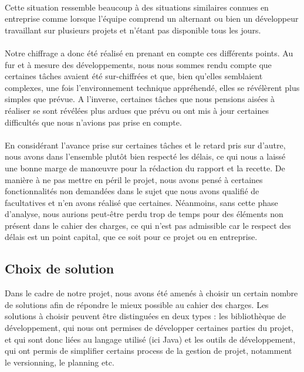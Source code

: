 \documentclass[a4paper,11pt]{article}
\begin{document}
\paragraph{} Cette situation ressemble beaucoup à des situations similaires connues en entreprise comme lorsque l'équipe comprend un alternant ou bien un développeur travaillant sur plusieurs projets et n'étant pas disponible tous les jours.

\paragraph{} Notre chiffrage a donc été réalisé en prenant en compte ces différents points. Au fur et à mesure des développements, nous nous sommes rendu compte que certaines tâches avaient été sur-chiffrées et que, bien qu'elles semblaient complexes, une fois l'environnement technique appréhendé, elles se révélèrent plus simples que prévue. A l'inverse, certaines tâches que nous pensions aisées à réaliser se sont révélées plus ardues que prévu ou ont mis à jour certaines difficultés que nous n'avions pas prise en compte.

\paragraph{} En considérant l'avance prise sur certaines tâches et le retard pris sur d'autre, nous avons dans l'ensemble plutôt bien respecté les délais, ce qui nous a laissé une bonne marge de manœuvre pour la rédaction du rapport et la recette. De manière à ne pas mettre en péril le projet, nous avons pensé à certaines fonctionnalités non demandées dans le sujet que nous avons qualifié de facultatives et n'en avons réalisé que certaines. Néanmoins, sans cette phase d'analyse, nous aurions peut-être perdu trop de temps pour des éléments non présent dans le cahier des charges, ce qui n'est pas admissible car le respect des délais est un point capital, que ce soit pour ce projet ou en entreprise.

\subsection{Choix de solution}
Dans le cadre de notre projet, nous avons été amenés à choisir un certain nombre de solutions afin de répondre le mieux possible au cahier des charges. Les solutions à choisir peuvent être distinguées en deux types : les bibliothèque de développement, qui nous ont permises de développer certaines parties du projet, et qui sont donc liées au langage utilisé (ici Java) et les outils de développement, qui ont permis de simplifier certains process de la gestion de projet, notamment le versionning, le planning etc.
\end{document}
